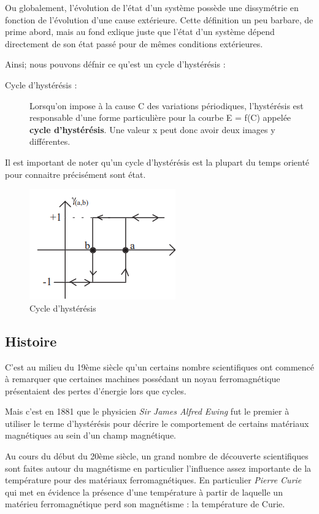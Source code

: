 \documentclass[11pt]{article}
\begin{document}
Ou globalement, l'évolution de l'état d'un système possède une dissymétrie en fonction de l'évolution d'une cause extérieure.
Cette définition un peu barbare, de prime abord, mais au fond exlique juste que l'état d'un système dépend directement de son état passé pour de mêmes conditions extérieures.



Ainsi; nous pouvons défnir ce qu'est un cycle d'hystérésis :
\begin{description}
    \item[Cycle d'hystérésis :] Lorsqu'on impose à la cause C des variations périodiques, l'hystérésis est responsable d'une forme particulière pour la 
    courbe E = f(C) appelée \textbf{cycle d'hystérésis}. Une valeur x peut donc avoir deux images y différentes.
\end{description}
Il est important de noter qu'un cycle d'hystérésis est la plupart du temps orienté pour connaitre précisément sont état.
\begin{figure}[H]
    \centering
    \includegraphics{Cycle_base.png}
    \caption{Cycle d'hystérésis}
    \label{fig:hysteresis_cycle_base}
\end{figure}

\subsection{Histoire}

C'est au milieu du 19ème siècle qu'un certains nombre scientifiques ont commencé à remarquer que
certaines machines possédant un noyau ferromagnétique présentaient des pertes d'énergie lors que cycles.



Mais c'est en 1881 que le physicien \textit{Sir James Alfred Ewing} fut le premier à utiliser le terme
d'hystérésis pour décrire le comportement de certains matériaux magnétiques au sein d'un champ magnétique.

Au cours du début du 20ème siècle, un grand nombre de découverte scientifiques sont faites autour du magnétisme
en particulier l'influence assez importante de la température pour des matériaux ferromagnétiques. 
En particulier \textit{Pierre Curie} qui met en évidence la présence d'une température à partir de laquelle
un matérieu ferromagnétique perd son magnétisme : la température de Curie.
\end{document}
